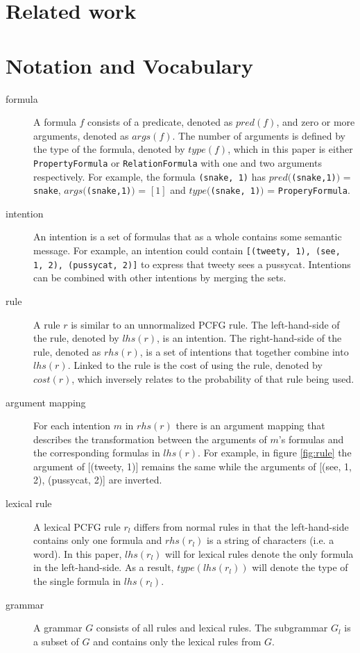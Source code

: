 \documentclass[a4paper]{article}
\begin{document}
\section{Related work}
\section{Notation and Vocabulary}
\begin{description}
    \item[formula] A formula $f$ consists of a predicate, denoted as $pred(f)$, and zero or more arguments, denoted as $args(f)$. The number of arguments is defined by the type of the formula, denoted by $type(f)$, which in this paper is either \verb|PropertyFormula| or \verb|RelationFormula| with one and two arguments respectively. For example, the formula \verb|(snake, 1)| has $pred($\verb|(snake,1)|$)$ = \verb|snake|, $args($\verb|(snake,1)|$)$ = $[1]$ and $type($\verb|(snake, 1)|$)$ = \verb|ProperyFormula|.
    \item[intention] An intention is a set of formulas that as a whole contains some semantic message. For example, an intention could contain \verb|[(tweety, 1), (see, 1, 2), (pussycat, 2)]| to express that tweety sees a pussycat. Intentions can be combined with other intentions by merging the sets.
    \item[rule] A rule $r$ is similar to an unnormalized PCFG rule. The left-hand-side of the rule, denoted by $lhs(r)$, is an intention. The right-hand-side of the rule, denoted as $rhs(r)$, is a set of intentions that together combine into $lhs(r)$. Linked to the rule is the cost of using the rule, denoted by $cost(r)$, which inversely relates to the probability of that rule being used.
    \item[argument mapping] For each intention $m$ in $rhs(r)$ there is an argument mapping that describes the transformation between the arguments of $m$'s formulas and the corresponding formulas in $lhs(r)$. For example, in figure \ref{fig:rule} the argument of [(tweety, 1)] remains the same while the arguments of [(see, 1, 2),  (pussycat, 2)] are inverted.
    \item[lexical rule] A lexical PCFG rule $r_l$ differs from normal rules in that the left-hand-side contains only one formula and $rhs(r_l)$ is a string of characters (i.e. a word). In this paper, $lhs(r_l)$ will for lexical rules denote the only formula in the left-hand-side. As a result, $type(lhs(r_l))$ will denote the type of the single formula in $lhs(r_l)$.
    \item[grammar] A grammar $G$ consists of all rules and lexical rules. The subgrammar $G_l$ is a subset of $G$ and contains only the lexical rules from $G$.
\end{description}
\end{document}
